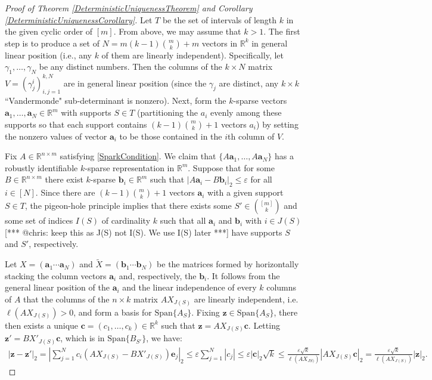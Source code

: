 \documentclass[journal, onecolumn]{IEEEtran}
\begin{document}
\begin{proof}[Proof of Theorem \ref{DeterministicUniquenessTheorem} and Corollary \ref{DeterministicUniquenessCorollary}]
Let $T$ be the set of intervals of length $k$ in the given cyclic order of $[m]$.  From above, we may assume that $k > 1$. The first step is to produce a set of $N = m(k-1){m \choose k}+m$ vectors in $\mathbb{R}^k$ in general linear position (i.e., any $k$ of them are linearly independent). Specifically, let $\gamma_1, \ldots, \gamma_N$ be any distinct numbers. Then the columns of the $k \times N$ matrix $V = (\gamma^i_j)^{k,N}_{i,j=1}$ are in general linear position (since the $\gamma_j$ are distinct, any $k \times k$ ``Vandermonde" sub-determinant is nonzero). Next, form the $k$-sparse vectors $\mathbf{a}_1, \ldots, \mathbf{a}_N \in \mathbb{R}^m$ with supports $S \in T$ (partitioning the $a_i$ evenly among these supports so that each support contains $(k-1){m \choose k}+1$ vectors $a_i$) by setting the nonzero values of vector $\mathbf{a}_i$ to be those contained in the $i$th column of $V$.

Fix $A \in \mathbb{R}^{n \times m}$ satisfying \eqref{SparkCondition}. We claim that $\{A\mathbf{a}_1, \ldots, A\mathbf{a}_N\}$ has a robustly identifiable $k$-sparse representation in $\mathbb{R}^m$. Suppose that for some $B \in \mathbb{R}^{n \times m}$ there exist $k$-sparse $\mathbf{b}_i \in \mathbb{R}^m$ such that $|A\mathbf{a}_i - B\mathbf{b}_i|_2 \leq \varepsilon$ for all $i \in [N]$. Since there are $(k-1){m \choose k}+1$ vectors $\mathbf{a}_i$ with a given support $S \in T$, the pigeon-hole principle implies that there exists some $S' \in {[m] \choose k}$ and some set of indices $I(S)$ of cardinality $k$ such that all $\mathbf{a}_i$ and $\mathbf{b}_i$ with $i \in J(S)$ [*** @chris: keep this as J(S) not I(S). We use I(S) later ***] have supports $S$ and $S'$, respectively.

Let $X = (\mathbf{a}_1 \cdots \mathbf{a}_N)$ and $\tilde{X} = (\mathbf{b}_1 \cdots \mathbf{b}_N)$ be the matrices formed by horizontally stacking the column vectors $\mathbf{a}_i$ and, respectively, the $\mathbf{b}_i$. It follows from the general linear position of the $\mathbf{a}_i$ and the linear independence of every $k$ columns of $A$ that the columns of the $n \times k$ matrix $AX_{J(S)}$ are linearly independent, i.e. $\ell(AX_{J(S)}) > 0$, and form a basis for $\text{Span}\{A_{S}\}$. Fixing $\mathbf{z} \in \text{Span}\{A_{S}\}$, there then exists a unique $\mathbf{c} = (c_1, \ldots, c_k) \in \mathbb{R}^k$ such that $\mathbf{z} = AX_{J(S)}\mathbf{c}$. Letting $\mathbf{z'} = BX'_{J(S)}\mathbf{c}$, which is in $\text{Span}\{B_{S'}\}$, we have:
\begin{align*}
|\mathbf{z} - \mathbf{z'}|_2 = |\sum_{j=1}^N c_i(AX_{J(S)} - BX'_{J(S)})\mathbf{e}_j|_2 
\leq \varepsilon \sum_{j=1}^N |c_j| 
\leq \varepsilon |\mathbf{c}|_2 \sqrt{k}  
\leq \frac{\varepsilon \sqrt{k}}{\ell(AX_{JS)})} |AX_{J(S)}\mathbf{c}|_2
= \frac{\varepsilon \sqrt{k}}{\ell(AX_{J(S)})} |\mathbf{z}|_2.
\end{align*}


\end{proof}
\end{document}

